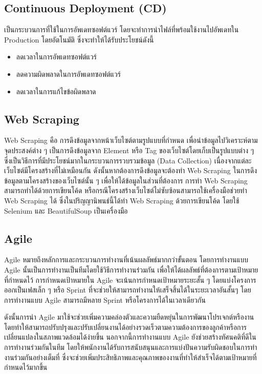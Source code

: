 \documentclass[12pt,oneside,openright,a4paper]{cpe-thai-project}
\begin{document}
  \subsection{Continuous Deployment (CD)}
    \hspace{1cm}เป็นกระบวนการที่ใช้ในการอัพเดทซอฟต์แวร์ โดยจะทำการนำไฟล์ที่พร้อมใช้งานไปอัพเดทใน Production โดยอัตโนมัติ \cite{ci_cd} ซึ่งจะทำให้ได้รับประโยชน์ดังนี้
    \begin{itemize}
      \item ลดเวลาในการอัพเดทซอฟต์แวร์
      \item ลดความผิดพลาดในการอัพเดทซอฟต์แวร์
      \item ลดเวลาในการแก้ไขข้อผิดพลาด
    \end{itemize}

  \subsection{Web Scraping}
    \hspace{1cm}Web Scraping \cite{agile} คือ การดึงข้อมูลจากหน้าเว็บไซต์ตามรูปแบบที่กำหนด เพื่อนำข้อมูลไปวิเคราะห์ตามจุดประสงค์ต่าง ๆ
    เป็นการดึงข้อมูลจาก Element หรือ Tag ของเว็บไซต์โดยเก็บเป็นรูปแบบต่าง ๆ ซึ่งเป็นวิธีการที่มีประโยชน์มากในกระบวนการรวบรวมข้อมูล (Data Collection)
    เนื่องจากแต่ละเว็บไซต์มีโครงสร้างที่ไม่เหมือนกัน ดังนั้นหากต้องการดึงข้อมูลจะต้องทำ Web Scraping ในการดึงข้อมูลตามโครงสร้างของเว็บไซต์นั้น ๆ 
    เพื่อให้ได้ข้อมูลในส่วนที่ต้องการ การทำ Web Scraping สามารถทำได้ด้วยการเขียนโค้ด หรือกรณีโครงสร้างเว็บไซต์ไม่ซับซ้อนสามารถใช้เครื่องมือช่วยทำ Web Scraping ได้
    ซึ่งในปริญญานิพนธ์นี้ได้ทำ Web Scraping ด้วยการเขียนโค้ด โดยใช้ Selenium และ BeautifulSoup เป็นเครื่องมือ
 
  \subsection{Agile}
    \hspace{1cm}Agile \cite{agile} หมายถึงหลักการและกระบวนการทํางานที่เน้นผลลัพธ์มากกว่าขั้นตอน 
    โดยการทํางานแบบ Agile นั้นเป็นการทํางานเป็นทีมโดยใช้วิธีการทํางานร่วมกัน 
    เพื่อให้ได้ผลลัพธ์ที่ต้องการตามเป้าหมายที่กําหนดไว้ การกําหนดเป้าหมายใน Agile จะเน้นการกําหนดเป้าหมายระยะสั้น ๆ 
    โดยแบ่งโครงการออกเป็นเฟสเล็ก ๆ หรือ Sprint ที่จะช่วยให้สามารถทํางานให้เสร็จสิ้นได้ในระยะเวลาอันสั้นๆ 
    โดย การทํางานแบบ Agile สามารถมีหลาย Sprint หรือโครงการได้ในเวลาเดียวกัน

    \hspace{1cm}ดังนั้นการนํา Agile มาใช้จะช่วยเพิ่มความคล่องตัวและความยืดหยุ่นในการพัฒนาโปรเจกต์หรืองาน 
    โดยทําให้สามารถปรับปรุงและปรับเปลี่ยนงานได้อย่างรวดเร็วตามความต้องการของลูกค้าหรือการเปลี่ยนแปลงในสภาพแวดล้อมได้ง่ายขึ้น 
    นอกจากนี้การทํางานแบบ Agile ยังช่วยสร้างทัศนคติที่ดีในการทํางานร่วมกันในทีม 
    โดยให้พนักงานได้รับการสนับสนุนและการแบ่งปันความรับผิดชอบในการทํางานร่วมกันอย่างเต็มที่ 
    ซึ่งจะช่วยเพิ่มประสิทธิภาพและคุณภาพของงานที่ทําให้สําเร็จได้ตามเป้าหมายที่กําหนดไว้มากขึ้น
\end{document}
